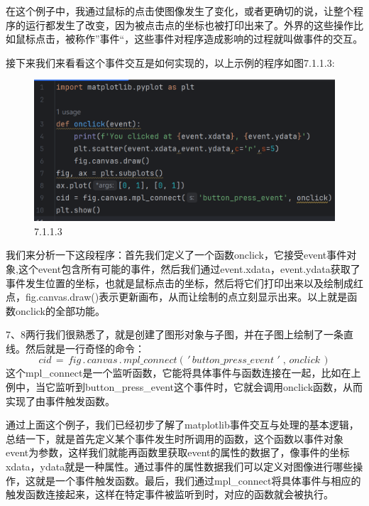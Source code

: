\documentclass[12pt]{article}
\begin{document}
在这个例子中，我通过鼠标的点击使图像发生了变化，或者更确切的说，让整个程序的运行都发生了改变，因为被点击点的坐标也被打印出来了。外界的这些操作比如鼠标点击，被称作”事件“，这些事件对程序造成影响的过程就叫做事件的交互。

接下来我们来看看这个事件交互是如何实现的，以上示例的程序如图7.1.1.3:
\begin{figure}[H]
    \centering
    \includegraphics[width=0.55\linewidth]{交互 program1.png}
    \caption{7.1.1.3}
    \label{fig:enter-label}
\end{figure}
我们来分析一下这段程序：首先我们定义了一个函数onclick，它接受event事件对象,这个event包含所有可能的事件，然后我们通过event.xdata，event.ydata获取了事件发生位置的坐标，也就是鼠标点击的坐标，然后将它们打印出来以及绘制成红点，fig.canvas.draw()表示更新画布，从而让绘制的点立刻显示出来。以上就是函数onclick的全部功能。

7、8两行我们很熟悉了，就是创建了图形对象与子图，并在子图上绘制了一条直线。然后就是一行奇怪的命令：
\[cid\, = \,fig\,.\,canvas\,.\,mpl\_connect(\,'\,button\_press\_event\,\,'\;,\, onclick\,)\]
这个mpl\_connect是一个监听函数，它能将具体事件与函数连接在一起，比如在上例中，当它监听到button\_press\_event这个事件时，它就会调用onclick函数，从而实现了由事件触发函数。

通过上面这个例子，我们已经初步了解了matplotlib事件交互与处理的基本逻辑，总结一下，就是首先定义某个事件发生时所调用的函数，这个函数以事件对象event为参数，这样我们就能再函数里获取event的属性的数据了，像事件的坐标xdata，ydata就是一种属性。通过事件的属性数据我们可以定义对图像进行哪些操作，这就是一个事件触发函数。最后，我们通过mpl\_connect将具体事件与相应的触发函数连接起来，这样在特定事件被监听到时，对应的函数就会被执行。
\end{document}
